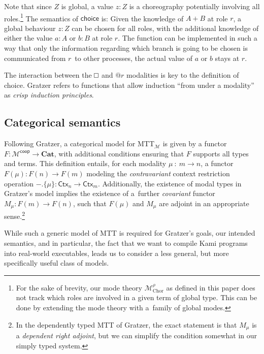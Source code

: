 \documentclass{scrartcl}
\renewcommand{\square}{\mathop{\mathchoice%
  {\tikz{\draw (0,0) rectangle (0.2cm,0.2cm);}}%
  {\tikz{\draw (0,0) rectangle (0.2cm,0.2cm);}}%
  {\tikz{\draw (0,0) rectangle (0.15cm,0.15cm);}}%
  {\tikz{\draw (0,0) rectangle (0.10cm,0.10cm);}}}}
\theoremstyle{definition}
\theoremstyle{plain}
\newcommand{\modetheory}[1]{\mathcal{#1}}
\newcommand{\M}{\modetheory{M}}
\newcommand{\MrhoChor}{\M^\rho_{\textrm{Chor}}}
\newcommand{\MTTM}{MTT${}_{\M}$}
\begin{document}
Note that since $Z$ is global, a value $z : Z$ is a choreography potentially
involving all roles.\footnote{For the sake of brevity, our mode theory
  $\MrhoChor$ as defined in this paper does not track which roles are involved
  in a given term of global type. This can be done by extending the mode theory
  with a~family of global modes.}
The semantics of $\textsf{choice}$ is: Given the knowledge of $A + B$ at role
$r$, a global behaviour $z : Z$ can be chosen for all roles, with the
additional knowledge of either the value $a : A$ or $b : B$ at role $r$. The
function can be implemented in such a way that only the information regarding
which branch is going to be chosen is communicated from $r$~to other processes,
the actual value of $a$ or $b$ stays at $r$.

The interaction between the $\square$ and $@r$ modalities is key to the
definition of \textsf{choice}. Gratzer refers to functions that allow induction
``from under a modality'' as \emph{crisp induction
principles}\cite[§6.3.1]{gratzer2023syntax}.



\subsection{Categorical semantics}
Following Gratzer, a categorical model for \MTTM{} is given by a functor $F :
\M^{\textsf{coop}} \to \textbf{Cat}$, with additional conditions ensuring that
$F$ supports all types and terms. This definition entails, for each modality
$\mu~:~m \to n$, a functor $F(\mu) : F(n) \to F(m)$ modeling the
\emph{contravariant} context restriction operation ${-}.\{\mu\} :
\textsf{Ctx}_n \to \textsf{Ctx}_m$. Additionally, the existence of modal types
in Gratzer's model implies the existence of a~further \emph{covariant} functor
$M_\mu : F(m) \to F(n)$, such that $F(\mu)$ and $M_\mu$ are adjoint in an
appropriate sense.\footnote{In the dependently typed MTT of Gratzer, the exact
  statement is that $M_\mu$ is a \emph{dependent right adjoint}, but we can
  simplify the condition somewhat in our simply typed system.}

While such a generic model of MTT is required for Gratzer's goals, our intended
semantics, and in particular, the fact that we want to compile Kami programs
into real-world executables, leads us to consider a less general, but more
specifically useful class of models.
\end{document}
